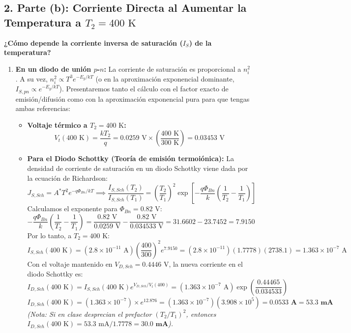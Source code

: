 \documentclass[11pt,a4paper]{article}
\begin{document}
\subsection*{2. Parte (b): Corriente Directa al Aumentar la Temperatura a $T_2 = 400\text{ K}$}
\textbf{¿Cómo depende la corriente inversa de saturación ($I_S$) de la temperatura?}
\begin{enumerate}
    \item \textbf{En un diodo de unión $p$-$n$:} La corriente de saturación es proporcional a $n_i^2$. A su vez, $n_i^2 \propto T^3 e^{-E_g / kT}$ (o en la aproximación exponencial dominante, $I_{S,pn} \propto e^{-E_g / kT}$). Presentaremos tanto el cálculo con el factor exacto de emisión/difusión como con la aproximación exponencial pura para que tengas ambas referencias:
    \begin{itemize}
        \item \textbf{Voltaje térmico a $T_2 = 400\text{ K}$:}
        \[
        V_t(400\text{ K}) = \frac{k T_2}{q} = 0.0259\text{ V} \times \left(\frac{400\text{ K}}{300\text{ K}}\right) = 0.03453\text{ V}
        \]
        \item \textbf{Para el Diodo Schottky (Teoría de emisión termoiónica):}
        La densidad de corriente de saturación en un diodo Schottky viene dada por la ecuación de Richardson:
        \[
        J_{S,Sch} = A^* T^2 e^{-q\Phi_{Bn} / kT} \implies \frac{I_{S,Sch}(T_2)}{I_{S,Sch}(T_1)} = \left(\frac{T_2}{T_1}\right)^2 \exp\left[ -\frac{q\Phi_{Bn}}{k}\left(\frac{1}{T_2} - \frac{1}{T_1}\right) \right]
        \]
        Calculamos el exponente para $\Phi_{Bn} = 0.82\text{ V}$:
        \[
        -\frac{q\Phi_{Bn}}{k}\left(\frac{1}{T_2} - \frac{1}{T_1}\right) = \frac{0.82\text{ V}}{0.0259\text{ V}} - \frac{0.82\text{ V}}{0.034533\text{ V}} = 31.6602 - 23.7452 = 7.9150
        \]
        Por lo tanto, a $T_2 = 400\text{ K}$:
        \[
        I_{S,Sch}(400\text{ K}) = (2.8 \times 10^{-11}\text{ A}) \left(\frac{400}{300}\right)^2 e^{7.9150} = (2.8 \times 10^{-11}) (1.7778) (2738.1) = 1.363 \times 10^{-7}\text{ A}
        \]
        Con el voltaje mantenido en $V_{D,Sch} = 0.4446\text{ V}$, la nueva corriente en el diodo Schottky es:
        \[
        I_{D,Sch}(400\text{ K}) = I_{S,Sch}(400\text{ K}) e^{V_{D,Sch} / V_t(400)} = (1.363 \times 10^{-7}\text{ A}) \exp\left(\frac{0.44465}{0.034533}\right)
        \]
        \[
        I_{D,Sch}(400\text{ K}) = (1.363 \times 10^{-7}) \times e^{12.876} = (1.363 \times 10^{-7})(3.908 \times 10^5) = \mathbf{0.0533\text{ A} = 53.3\text{ mA}}
        \]
        \textit{(Nota: Si en clase desprecian el prefactor $(T_2/T_1)^2$, entonces $I_{D,Sch}(400\text{ K}) = 53.3\text{ mA} / 1.7778 = \mathbf{30.0\text{ mA}}$).}


\end{itemize}
\end{enumerate}
\end{document}
